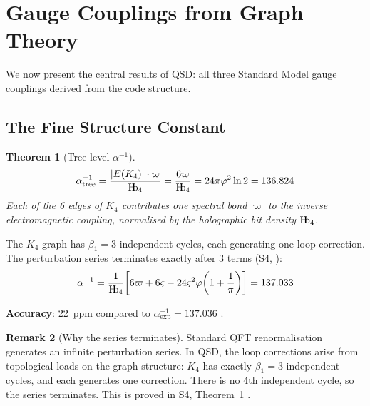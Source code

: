 \documentclass[11pt,a4paper]{article}
\newtheorem{theorem}{Theorem}[section]
\theoremstyle{definition}
\newtheorem{remark}[theorem]{Remark}
\newcommand{\Hb}{\textnormal{H\kern-0.3em b}}
\newcommand{\Hbfour}{\Hb_4}
\newcommand{\strain}{\varsigma}
\newcommand{\specbond}{\varpi}
\begin{document}
\section{Gauge Couplings from Graph Theory}
\label{sec:couplings}

We now present the central results of QSD: all three Standard Model gauge couplings derived from the code structure.

\subsection{The Fine Structure Constant}

\begin{theorem}[Tree-level $\alpha^{-1}$]
\label{thm:alpha_tree}
\begin{equation}
\alpha^{-1}_{\text{tree}} = \frac{|E(K_4)| \cdot \specbond}{\Hbfour} = \frac{6\specbond}{\Hbfour} = 24\pi\varphi^2\ln 2 = 136.824
\label{eq:alpha_tree}
\end{equation}
Each of the 6 edges of $K_4$ contributes one spectral bond $\specbond$ to the inverse electromagnetic coupling, normalised by the holographic bit density $\Hbfour$.
\end{theorem}

The $K_4$ graph has $\beta_1 = 3$ independent cycles, each generating one loop correction. The perturbation series terminates exactly after 3 terms (S4, \cite{Hubka2026QSDsupp}):
\begin{equation}
\alpha^{-1} = \frac{1}{\Hbfour}\!\left[6\specbond + 6\strain - 24\strain^2\varphi\!\left(1 + \frac{1}{\pi}\right)\right] = 137.033
\label{eq:alpha_full}
\end{equation}

\textbf{Accuracy}: 22~ppm compared to $\alpha^{-1}_{\text{exp}} = 137.036$ \cite{PDG2022}.

\begin{remark}[Why the series terminates]
Standard QFT renormalisation generates an infinite perturbation series. In QSD, the loop corrections arise from topological loads on the graph structure: $K_4$ has exactly $\beta_1 = 3$ independent cycles, and each generates one correction. There is no 4th independent cycle, so the series terminates. This is proved in S4, Theorem~1 \cite{Hubka2026QSDsupp}.
\end{remark}
\end{document}
